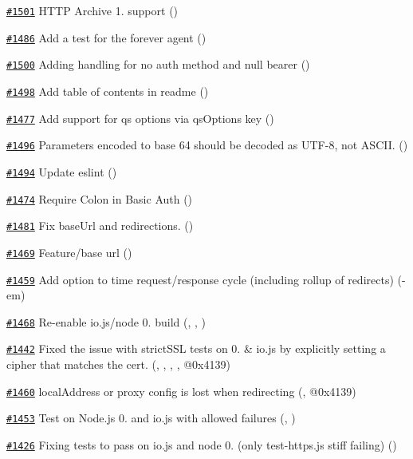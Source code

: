\begin{DoxyItemize}
\item \href{https://github.com/request/request/pull/1501}{\tt \#1501} H\+T\+TP Archive 1. support ()
\item \href{https://github.com/request/request/pull/1486}{\tt \#1486} Add a test for the forever agent ()
\item \href{https://github.com/request/request/pull/1500}{\tt \#1500} Adding handling for no auth method and null bearer ()
\item \href{https://github.com/request/request/pull/1498}{\tt \#1498} Add table of contents in readme ()
\item \href{https://github.com/request/request/pull/1477}{\tt \#1477} Add support for qs options via qs\+Options key ()
\item \href{https://github.com/request/request/pull/1496}{\tt \#1496} Parameters encoded to base 64 should be decoded as U\+T\+F-\/8, not A\+S\+C\+II. ()
\item \href{https://github.com/request/request/pull/1494}{\tt \#1494} Update eslint ()
\item \href{https://github.com/request/request/pull/1474}{\tt \#1474} Require Colon in Basic Auth ()
\item \href{https://github.com/request/request/pull/1481}{\tt \#1481} Fix base\+Url and redirections. ()
\item \href{https://github.com/request/request/pull/1469}{\tt \#1469} Feature/base url ()
\item \href{https://github.com/request/request/pull/1459}{\tt \#1459} Add option to time request/response cycle (including rollup of redirects) (-\/em)
\item \href{https://github.com/request/request/pull/1468}{\tt \#1468} Re-\/enable io.\+js/node 0. build (, , )
\item \href{https://github.com/request/request/pull/1442}{\tt \#1442} Fixed the issue with strict\+S\+SL tests on 0. \& io.\+js by explicitly setting a cipher that matches the cert. (, , , , @0x4139)
\item \href{https://github.com/request/request/pull/1460}{\tt \#1460} local\+Address or proxy config is lost when redirecting (, @0x4139)
\item \href{https://github.com/request/request/pull/1453}{\tt \#1453} Test on Node.\+js 0. and io.\+js with allowed failures (, )
\item \href{https://github.com/request/request/pull/1426}{\tt \#1426} Fixing tests to pass on io.\+js and node 0. (only test-\/https.\+js stiff failing) ()

\end{DoxyItemize}
